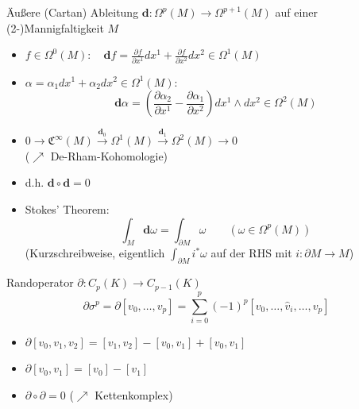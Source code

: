 \documentclass{beamer}
\renewcommand{\d}{\textbf{d}}
\newcommand{\ablx}[2]{\frac{\partial #1}{\partial x^{#2}}}
\begin{document}
  \begin{frame}
    \begin{block}{Äußere (Cartan) Ableitung \( \d: \Omega^{p}(M) \longrightarrow \Omega^{p+1}(M) \) auf einer (2-)Mannigfaltigkeit \( M \)}
      \begin{itemize}
        \item \( f \in \Omega^{0}(M):\quad \d f = \ablx{f}{1}dx^{1} + \ablx{f}{2}dx^{2} \in  \Omega^{1}(M)\)
        \item \( \alpha = \alpha_{1}dx^{1} + \alpha_{2}dx^{2} \in \Omega^{1}(M):\) 
                \[\d\alpha = \left( \ablx{\alpha_{2}}{1} - \ablx{\alpha_{1}}{2} \right) dx^{1} \wedge dx^{2} \in \Omega^{2}(M)\]
        \item \( 0 \rightarrow \mathfrak{C}^{\infty}(M) \overset{\d_{0}}{\rightarrow} \Omega^{1}(M) \overset{\d_{1}}{\rightarrow} \Omega^{2}(M) \rightarrow 0\) \\
              (\( \nearrow \) De-Rham-Kohomologie)
        \item d.h. \( \d\circ\d = 0 \)
        \item Stokes' Theorem: 
            \[ \int_{M}\d\omega = \int_{\partial M} \omega \qquad (\omega\in\Omega^{p}(M))\]
            (Kurzschreibweise, eigentlich \( \int_{\partial M} i^{*}\omega \) auf der RHS mit \( i: \partial M \rightarrow M \))
      \end{itemize}
    \end{block}
  \end{frame}

  \begin{frame}
    \begin{block}{Randoperator \( \partial:C_{p}(K) \longrightarrow C_{p-1}(K) \)}
      \[ \partial\sigma^{p} = \partial\left[ v_{0}, \ldots, v_{p} \right] = \sum_{i=0}^{p} (-1)^{p} \left[ v_{0}, \ldots, \hat{v}_{i}, \ldots,  v_{p} \right]\]
      \begin{itemize}
        \item \( \partial\left[ v_{0}, v_{1}, v_{2} \right] = \left[ v_{1}, v_{2} \right] - \left[ v_{0}, v_{1} \right] + \left[ v_{0}, v_{1} \right]\)
        \item \( \partial\left[ v_{0}, v_{1} \right] = \left[ v_{0} \right] - \left[ v_{1} \right]\)
        \item \( \partial\circ\partial = 0 \) \qquad(\( \nearrow \) Kettenkomplex)
      \end{itemize}
    \end{block}
  \end{frame}
\end{document}
